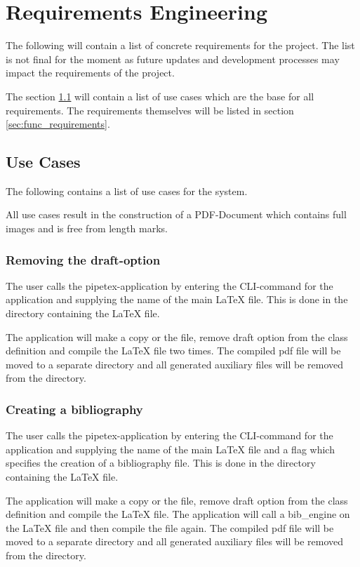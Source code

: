 \section{Requirements Engineering}
The following will contain a list of concrete requirements for the project.
The list is not final for the moment as future updates and development
processes may impact the requirements of the project.

The section \ref{sec:use cases} will contain a list of use cases which are the
base for all requirements. The requirements themselves will be listed in
section \ref{sec:func_requirements}.

\subsection{Use Cases}\label{sec:use cases}
The following contains a list of use cases for the system. 

All use cases result in the construction of a PDF-Document which contains full
images and is free from length marks.

\subsubsection*{Removing the draft-option}
The user calls the pipetex-application by entering the CLI-command for the
application and supplying the name of the main {\LaTeX} file.  This is done in
the directory containing the {\LaTeX} file.

The application will make a copy or the file, remove draft option from the
class definition and compile the {\LaTeX} file two times. The compiled pdf file
will be moved to a separate directory and all generated auxiliary files will be
removed from the directory.

\subsubsection*{Creating a bibliography}
The user calls the pipetex-application by entering the CLI-command for the
application and supplying the name of the main {\LaTeX} file and a flag which
specifies the creation of a bibliography file.  This is done in the directory
containing the {\LaTeX} file.

The application will make a copy or the file, remove draft option from the
class definition and compile the {\LaTeX} file. The application will call a
\gls{bib_engine} on the {\LaTeX} file and then compile the file again. The
compiled pdf file will be moved to a separate directory and all generated
auxiliary files will be removed from the directory.

